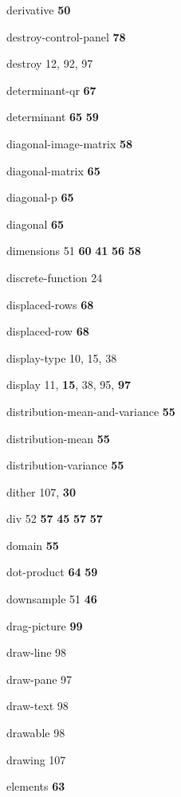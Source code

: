 \begin{theindex}
\item {\ptt derivative} {\bf 50}
\item {\ptt destroy-control-panel} {\bf 78}
\item {\ptt destroy} 12, 92, 97
\item {\ptt determinant-qr} {\bf 67}
\item {\ptt determinant} {\bf 65}
 {\bf 59}
\item {\ptt diagonal-image-matrix} {\bf 58}
\item {\ptt diagonal-matrix} {\bf 65}
\item {\ptt diagonal-p} {\bf 65}
\item {\ptt diagonal} {\bf 65}
\item {\ptt dimensions} 51
 {\bf 60}
 {\bf 41}
 {\bf 56}
 {\bf 58}
\item {\ptt discrete-function} 24
\item {\ptt displaced-rows} {\bf 68}
\item {\ptt displaced-row} {\bf 68}
\item {\ptt display-type} 10, 15, 38
\item {\ptt display} 11, {\bf 15}, 38, 95, {\bf 97}
\item {\ptt distribution-mean-and-variance} {\bf 55}
\item {\ptt distribution-mean} {\bf 55}
\item {\ptt distribution-variance} {\bf 55}
\item {\ptt dither} 107, {\bf 30}
\item {\ptt div} 52
 {\bf 57}
 {\bf 45}
 {\bf 57}
 {\bf 57}
\item {\ptt domain} {\bf 55}
\item {\ptt dot-product}
 {\bf 64}
 {\bf 59}
\item {\ptt downsample} 51
 {\bf 46}
\item {\ptt drag-picture} {\bf 99}
\item {\ptt draw-line} 98
\item {\ptt draw-pane} 97
\item {\ptt draw-text} 98
\item {\ptt drawable} 98
\item {\ptt drawing} 107
\item {\ptt elements} {\bf 63}

\end{theindex}
